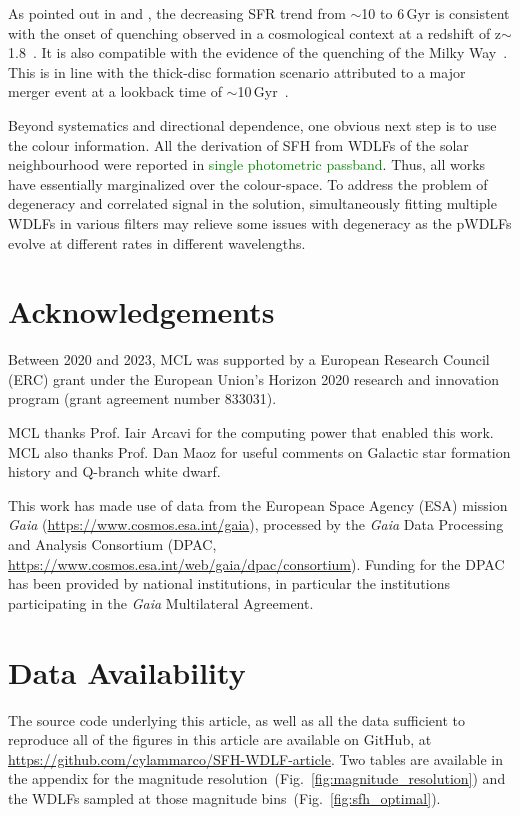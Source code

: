 \documentclass[fleqn,usenatbib]{mnras}
\begin{document}
As pointed out in \citet{2019A&A...624L...1M} and \citet{2019ApJ...878L..11I},
the decreasing SFR trend from $\sim$10 to 6\,Gyr is consistent with the
onset of quenching observed in a cosmological context at a redshift of
z$\sim$1.8~\citep[corresponds to a lookback time of
$\sim$10\,Gyr, e.g.][]{2016MNRAS.461.1100R, 2017MNRAS.471.4155K}. It is
also compatible with the evidence of the quenching of the Milky
Way~\citep{2016A&A...589A..66H}. This is in line with the thick-disc formation
scenario attributed to a major merger event at a lookback time of 
$\sim$10\,Gyr~\citep{2018Natur.563...85H}.

Beyond systematics and directional dependence, one obvious next step is to use
the colour information. All the derivation of SFH from WDLFs of the solar 
neighbourhood were reported in \textcolor{green}{single photometric passband}.
Thus, all works have essentially marginalized over the colour-space. To address the
problem of degeneracy and correlated signal in the solution, simultaneously
fitting multiple WDLFs in various filters may relieve some issues with degeneracy
as the pWDLFs evolve at different rates in different wavelengths.


\section*{Acknowledgements}
Between 2020 and 2023, MCL was supported by a European Research Council (ERC)
grant under the European Union’s Horizon 2020 research and innovation program
(grant agreement number 833031).

MCL thanks Prof. Iair Arcavi for the computing power that enabled this work.
MCL also thanks Prof. Dan Maoz for useful comments on Galactic star formation
history and Q-branch white dwarf.

This work has made use of data from the European Space Agency (ESA) mission
\textit{Gaia} (\url{https://www.cosmos.esa.int/gaia}), processed by the \textit{Gaia}
Data Processing and Analysis Consortium (DPAC,
\url{https://www.cosmos.esa.int/web/gaia/dpac/consortium}). Funding for the DPAC
has been provided by national institutions, in particular the institutions
participating in the \textit{Gaia} Multilateral Agreement.


\section*{Data Availability}
The source code underlying this article, as well as all the data sufficient to
reproduce all of the figures in this article are available on GitHub, at 
\url{https://github.com/cylammarco/SFH-WDLF-article}. Two tables are available
in the appendix for the magnitude
resolution~(Fig.~\ref{fig:magnitude_resolution}) and the WDLFs sampled at those
magnitude bins~(Fig.~\ref{fig:sfh_optimal}).
\end{document}
